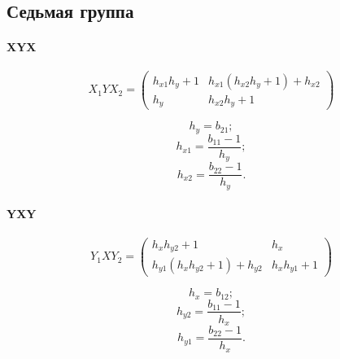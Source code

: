 \subsection{Седьмая группа}

\paragraph{XYX}

$$X_1YX_2 =
\begin{pmatrix}
	h_{x1}h_y + 1 & h_{x1}\left(h_{x2}h_y + 1\right) + h_{x2} \\
	h_y & h_{x2}h_y + 1
\end{pmatrix}$$

$$h_y = b_{21};$$
$$h_{x1} = \frac{b_{11} - 1}{h_y};$$
$$h_{x2} = \frac{b_{22} - 1}{h_y}.$$

\paragraph{YXY}

$$Y_1XY_2 = 
\begin{pmatrix}
h_x h_{y2} + 1 & h_x \\
h_{y1} \left( {h_x} {h_{y2}}+1\right) +{h_{y2}} & {h_x} {h_{y1}} + 1
\end{pmatrix}
$$

$$h_x = b_{12};$$
$$h_{y2} = \frac{b_{11} - 1}{h_x};$$
$$h_{y1} = \frac{b_{22} - 1}{h_x}.$$
